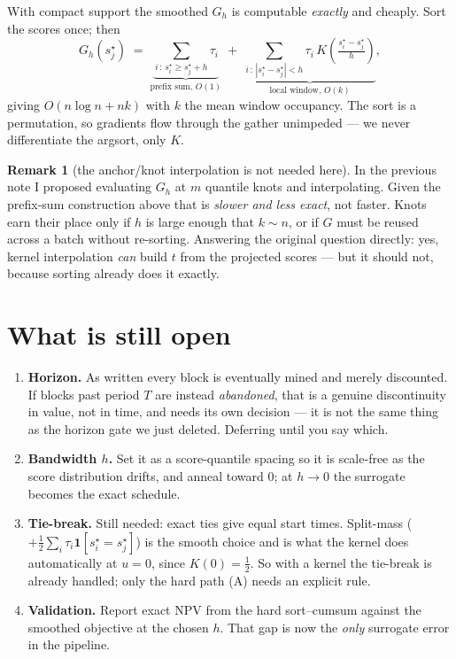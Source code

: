 \documentclass[11pt,a4paper]{article}
\newcommand{\ind}[1]{\mathbf{1}\!\left[#1\right]}
\newcommand{\sstar}{s^{\star}}
\theoremstyle{definition}
\newtheorem{remark}{Remark}
\begin{document}
With compact support the smoothed $G_h$ is computable \emph{exactly} and cheaply. Sort the scores
once; then
\[
  G_h(\sstar_j)
  \;=\; \underbrace{\sum_{i\,:\,\sstar_i \ge \sstar_j + h} \tau_i}_{\text{prefix sum, }O(1)}
  \;+\; \underbrace{\sum_{i\,:\,|\sstar_i - \sstar_j| < h} \tau_i\, K\!\left(\tfrac{\sstar_i-\sstar_j}{h}\right)}_{\text{local window, }O(k)} ,
\]
giving $O(n\log n + nk)$ with $k$ the mean window occupancy. The sort is a permutation, so
gradients flow through the gather unimpeded --- we never differentiate the argsort, only $K$.

\begin{remark}[the anchor/knot interpolation is not needed here]
In the previous note I proposed evaluating $G_h$ at $m$ quantile knots and interpolating. Given
the prefix-sum construction above that is \emph{slower and less exact}, not faster. Knots earn
their place only if $h$ is large enough that $k \sim n$, or if $G$ must be reused across a batch
without re-sorting. Answering the original question directly: yes, kernel interpolation
\emph{can} build $t$ from the projected scores --- but it should not, because sorting already
does it exactly.
\end{remark}

\section{What is still open}

\begin{enumerate}[leftmargin=1.6em,itemsep=3pt]
  \item \textbf{Horizon.} As written every block is eventually mined and merely discounted. If
        blocks past period $T$ are instead \emph{abandoned}, that is a genuine discontinuity in
        value, not in time, and needs its own decision --- it is not the same thing as the
        horizon gate we just deleted. Deferring until you say which.
  \item \textbf{Bandwidth $h$.} Set it as a score-quantile spacing so it is scale-free as the
        score distribution drifts, and anneal toward $0$; at $h\to 0$ the surrogate becomes the
        exact schedule.
  \item \textbf{Tie-break.} Still needed: exact ties give equal start times. Split-mass
        ($+\tfrac12\sum_i \tau_i \ind{\sstar_i = \sstar_j}$) is the smooth choice and is what the
        kernel does automatically at $u=0$, since $K(0)=\tfrac12$. So with a kernel the tie-break
        is already handled; only the hard path (A) needs an explicit rule.
  \item \textbf{Validation.} Report exact NPV from the hard sort--cumsum against the smoothed
        objective at the chosen $h$. That gap is now the \emph{only} surrogate error in the
        pipeline.
\end{enumerate}
\end{document}
